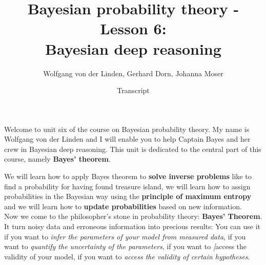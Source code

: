 \documentclass[12pt, a4paper]{scrartcl}
\title{Bayesian probability theory - Lesson 6:\\
Bayesian deep reasoning}
\author{Wolfgang von der Linden, Gerhard Dorn, Johanna Moser}
\date{Transcript}
\begin{document}
\setlength{\parindent}{0pt}
\maketitle
\onehalfspacing
Welcome to unit six of the course on Bayesian probability theory. 
My name is Wolfgang von der Linden and I will enable you to help 
Captain Bayes and her crew in Bayesian deep reasoning.
This unit is dedicated to the central part of this course, namely \textbf{Bayes’ theorem}.

We will learn how to apply Bayes theorem to \textbf{solve inverse problems}
like to find a probability for having found treasure island,
we will learn how to assign probabilities in the Bayesian way using the
\textbf{principle of maximum entropy}
and we will learn how to \textbf{update probabilities} based on new information.\\

Now we come to the philosopher’s stone in probability theory: \textbf{Bayes’ Theorem}.
It turn noisy data and erroneous information into precious results: You can
use it
if you want to \textit{infer the parameters of your model from measured data},
if you want to \textit{quantify the uncertainty of the parameters},
if you want to \textit[{access the validity of your model},
if you want to \textit{access the validity of certain hypotheses}.\\
\end{document}
